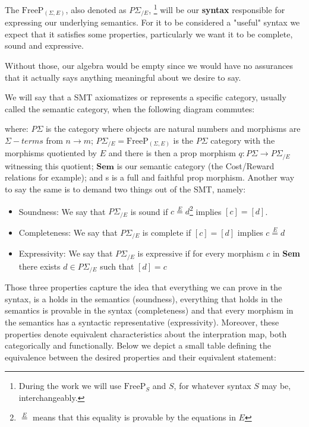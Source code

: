 The $\text{FreeP}_{(\Sigma,E)}$, also denoted as $P\Sigma_{/E}$,
\footnote{During the work we will use $\text{FreeP}_{S}$ and $S$, for
	whatever syntax $S$ may be, interchangeably.}
will be our \textbf{syntax} responsible for expressing our underlying semantics.
For it to be considered a "useful" syntax we expect that it satisfies some properties, particularly we want it to be complete, sound and expressive.

Without those, our algebra would be empty since we would have no assurances that it actually says anything meaningful about we desire to say.

\begin{definition}
	We will say that a SMT axiomatizes or represents a specific category, usually called the semantic category, when the following diagram commutes:
	\begin{figure}[H]
		\centering
		
	\end{figure}
	where: $P\Sigma$ is the category where objects are natural numbers and morphisms are $\Sigma-terms$ from $n \to m$; $P\Sigma_{/E} = \text{FreeP}_{(\Sigma,E)}$ is the  $P\Sigma$ category with the morphisms quotiented by $E$ and there is then a prop morphism $q : P\Sigma \to P\Sigma_{/E}$ witnessing this quotient; $\textbf{Sem}$ is our semantic category (the Cost/Reward relations for example); and s is a full and faithful prop morphism. Another way to say the same is to demand two things out of the SMT, namely:
	\begin{itemize}
		\item Soundness: We say that $P\Sigma_{/E}$ is sound if $c \overset{E}= d$\footnote{$\overset{E}=$ means that this equality is provable by the equations in $E$} implies $ [c] = [d]$.
		\item Completeness: We say that $P\Sigma_{/E}$ is complete if $[c] = [d]$ implies $c \overset{E}= d$
		\item Expressivity: We say that $P\Sigma_{/E}$ is expressive if for every morphism $c$ in \textbf{Sem} there exists $d \in P\Sigma_{/E}$ such that $[d] = c$
	\end{itemize}


\end{definition}

Those three properties capture the idea that everything we can prove in the syntax, is a holds in the semantics (soundness), everything that holds in the semantics is provable in the syntax (completeness) and that every morphism in the semantics has a syntactic representative (expressivity). Moreover, these properties denote equivalent characteristics about the interpration map, both categorically and functionally. Below we depict a small table defining the equivalence between the desired properties and their equivalent statement:

